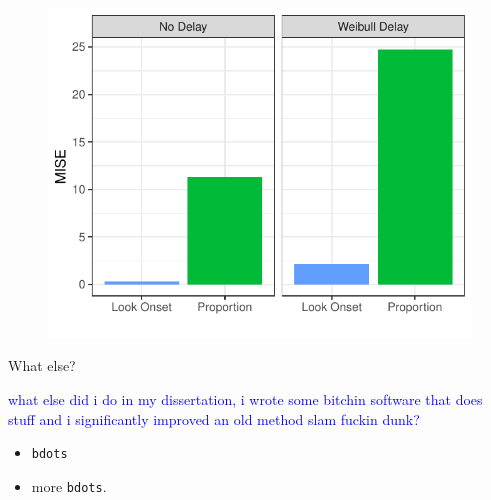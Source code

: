 \documentclass{beamer}
\newcommand{\xt}{\texttt}
\providecommand{\cn}[1]{\textcolor{blue}{#1}}
\begin{document}
%
%

\begin{frame}
\begin{figure}
\centering
\includegraphics{mise_bar.pdf}
\end{figure}
\end{frame}



\begin{frame}{What else?}

\cn{what else did i do in  my dissertation, i wrote some bitchin software that does stuff and i significantly improved an old method slam fuckin dunk?}

\begin{itemize}
\item \xt{bdots}
\item more \xt{bdots}.
\end{itemize}
\end{frame}
\end{document}

